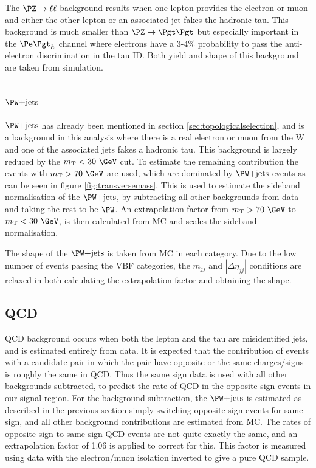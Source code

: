 The $\PZ\to\ell\ell$ background results when one lepton provides the electron or
muon and either the other lepton or an associated jet fakes the hadronic tau. This
background is much smaller than $\ZToTauTau$ but especially important in the
$\etau$ channel where electrons have a $3$-$4\%$ probability to pass the
anti-electron discrimination in the tau ID. Both yield and shape of this
background are taken from simulation.

\subsection{$\WJets$}
\label{sec:backgroundEstimation_WplusJets}

$\WJets$ has already been mentioned in section \ref{sec:topologicalselection},
and is a background in this analysis where there is a real electron or
muon from the W and one of the associated jets fakes a hadronic tau. This
background is largely reduced by the $m_{\text{T}}< 30~\GeV$ cut. 
To estimate the remaining contribution the
events with $m_{\text{T}}> 70~\GeV$ are used, which are dominated by $\WJets$ 
events as can be seen in figure \ref{fig:transversemass}. 
This is used to estimate the sideband normalisation of the $\WJets$, by
subtracting all other backgrounds from data and taking the rest to be $\PW$.
An extrapolation factor from  $m_{\text{T}} > 70~\GeV$ to $m_{\text{T}}< 30~\GeV$, 
is then calculated from MC and scales the sideband normalisation.

The shape of the $\WJets$ is taken from MC in each category. Due to the low number of
events passing the VBF categories, the $m_{jj}$ and $|\Delta\eta_{jj}|$
conditions are relaxed in both calculating the extrapolation factor and
obtaining the shape.

\subsection{QCD}
\label{sec:backgroundEstimation_QCD}

QCD background occurs when both the lepton and the tau are misidentified jets, and is estimated 
entirely from data. It is expected that the contribution of events with a
candidate pair in which the pair have opposite or the same
charges/signs is roughly the same in QCD. Thus the same
sign data is used with all other backgrounds subtracted, to predict the rate of
QCD in the opposite sign events in our signal region. 
For the background subtraction, the $\WJets$ is 
estimated as described in the previous section simply switching opposite sign
events for same sign, and all other background
contributions are estimated from \ac{MC}. The rates of opposite sign to same
sign QCD events are not quite exactly the same, and an extrapolation factor of
1.06 is applied to correct for this. This factor is measured using data with the 
electron/muon isolation inverted to give a pure QCD sample. 

